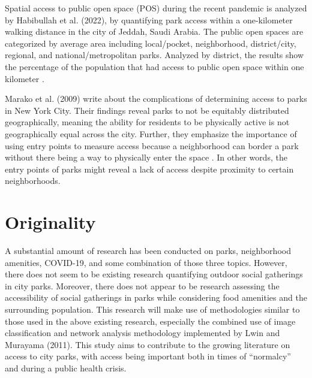 \begin{multicols}{2}
Spatial access to public open space (POS) during the recent pandemic is analyzed by Habibullah et al. (2022), by quantifying park access within a one-kilometer walking distance in the city of Jeddah, Saudi Arabia. The public open spaces are categorized by average area including local/pocket, neighborhood, district/city, regional, and national/metropolitan parks. Analyzed by district, the results show the percentage of the population that had access to public open space within one kilometer \cite{habibullah_one-kilometer_2022}.  

Marako et al. (2009) write about the complications of determining access to parks in New York City. Their findings reveal parks to not be equitably distributed geographically, meaning the ability for residents to be physically active is not geographically equal across the city. Further, they emphasize the importance of using entry points to measure access because a neighborhood can border a park without there being a way to physically enter the space \cite{maroko_complexities_2009}. In other words, the entry points of parks might reveal a lack of access despite proximity to certain neighborhoods.

\section{Originality}
A substantial amount of research has been conducted on parks, neighborhood amenities, COVID-19, and some combination of those three topics. However, there does not seem to be existing research quantifying outdoor social gatherings in city parks. Moreover, there does not appear to be research assessing the accessibility of social gatherings in parks while considering food amenities and the surrounding population. This research will make use of methodologies similar to those used in the above existing research, especially the combined use of image classification and network analysis methodology implemented by Lwin and Murayama (2011). This study aims to contribute to the growing literature on access to city parks, with access being important both in times of “normalcy” and during a public health crisis. 

\end{multicols}

